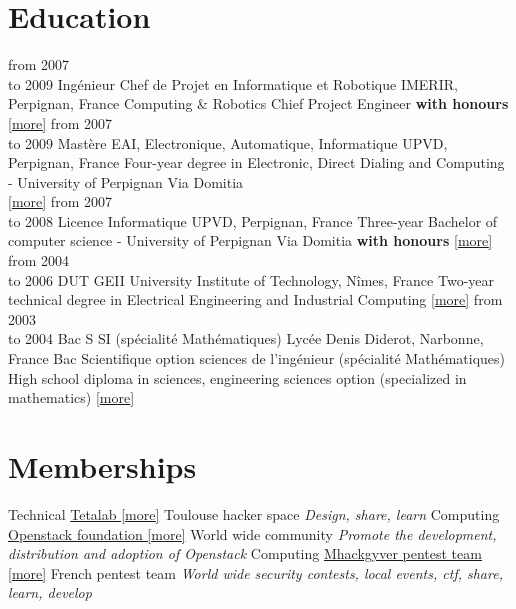 \documentclass[]{friggeri-cv}
\begin{document}
\section{Education}
\begin{entrylist}
    \entry
        {from 2007\\to 2009}
        {Ingénieur Chef de Projet en Informatique et Robotique}
        {IMERIR, Perpignan, France}
	{Computing \& Robotics Chief Project Engineer
	\textbf{with honours}\\
        \href{https://www.imerir.com/}{[\underline{more}]}
	}
    \entry
        {from 2007\\to 2009}
        {Mastère EAI, Electronique, Automatique, Informatique}
        {UPVD, Perpignan, France}
	{Four-year degree in Electronic, Direct Dialing and Computing - University of Perpignan Via Domitia\\
        \href{https://www.univ-perp.fr/master-electronique-automatique-informatique-28229.kjsp}{[\underline{more}]}
	}
    \entry
        {from 2007\\to 2008}
        {Licence Informatique}
        {UPVD, Perpignan, France}
	{Three-year Bachelor of computer science - University of Perpignan Via Domitia
	\textbf{with honours}
        \href{https://www.univ-perp.fr/licence-informatique-4727.kjsp}{[\underline{more}]}
	}
    \entry
        {from 2004 \\to 2006}
        {DUT GEII}
        {University Institute of Technology, Nîmes, France}
	{Two-year technical degree in Electrical Engineering and Industrial Computing 
        \href{http://www.iut-nimes.fr/dut/geii}{[\underline{more}]}
	}
    \entry
        {from 2003\\to 2004}
        {Bac S SI (spécialité Mathématiques)}
        {Lycée Denis Diderot, Narbonne, France}
	{Bac Scientifique option sciences de l'ingénieur (spécialité Mathématiques) \\
	High school diploma in sciences, engineering sciences option (specialized in mathematics)
        \href{https://www.lyc-michel-narbonne.ac-montpellier.fr/content/bac-s}{[\underline{more}]}
	}
\end{entrylist}

\section{Memberships}
\begin{entrylist}
    \entry
        {Technical}
        {\href{https://www.tetalab.org/en}{Tetalab [\underline{more}]}}
        {Toulouse hacker space}
        {\emph{Design, share, learn}}
    \entry
        {Computing}
        {\href{https://www.openstack.org/foundation/}{Openstack foundation [\underline{more}]}}
        {World wide community}
        {\emph{Promote the development, distribution and adoption of Openstack}}
    \entry
        {Computing}
        {\href{https://github.com/mhackgyver-squad/mhackgyver}{Mhackgyver pentest team [\underline{more}]}}
        {French pentest team}
        {\emph{World wide security contests, local events, ctf, share, learn, develop}}
\end{entrylist}
\newpage
\end{document}
